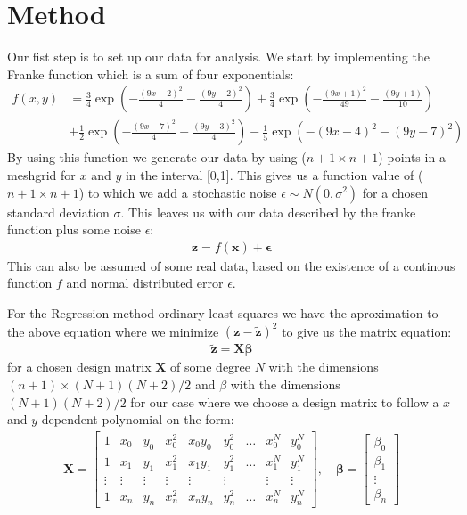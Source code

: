 \documentclass[12pt]{article}
\begin{document}
\section{Method}
Our fist step is to set up our data for analysis. We start by implementing the Franke function which is a sum of four exponentials:
\begin{align*}
  f(x,y) &= \frac{3}{4 }\exp\left(- \frac{(9x -2 )^2}{4} - \frac{(9y-2)^2}{4}\right) +\frac{3}{4}\exp{\left(-\frac{(9x+1)^2}{49}- \frac{(9y+1)}{10}\right)} \\
&+\frac{1}{2}\exp{\left(-\frac{(9x-7)^2}{4} - \frac{(9y-3)^2}{4}\right)} -\frac{1}{5}\exp{\left( -(9x-4)^2 - (9y-7)^2\right) }
\end{align*}
By using this function we generate our data by using ($n+1\times n+1$) points in a meshgrid for $x$ and $y$ in the interval [0,1]. This gives us a function value of ($n+1 \times n+1$) to which we add a stochastic noise $\epsilon \sim N(0,\sigma^2)$ for a chosen standard deviation $\sigma$. This leaves us with our data described by the franke function plus some noise $\epsilon$:
\begin{align*}
  \boldsymbol{z} = f(\boldsymbol{x}) + \boldsymbol{\epsilon}
\end{align*}
This can also be assumed of some real data, based on the existence of a continous function $f$ and normal distributed error $\epsilon$.

For the Regression method ordinary least squares we have the aproximation to the above equation where we minimize $(\boldsymbol{z} - \boldsymbol{\tilde{z}})^2$ to give us the matrix equation:
\begin{align*}
  \boldsymbol{\tilde{z}} = \boldsymbol{X}\boldsymbol{\beta}
\end{align*}
for a chosen design matrix $\boldsymbol{X}$ of some degree $N$ with the dimensions $(n+1)\times (N+1)(N+2)/2$ and $\beta$ with the dimensions $(N+1)(N+2)/2$  for our case where we choose a design matrix to follow a $x$ and $y$ dependent polynomial on the form:
\begin{align*}
  \boldsymbol{X} = \begin{bmatrix}
    1 & x_0 & y_0 & x_0^2 & x_0y_0 & y_0^2 & \hdots &x_0^N & y_0^N \\
    1 & x_1 & y_1 & x_1^2 & x_1y_1 & y_1^2 &\hdots& x_1^N & y_1^N \\
    \vdots & \vdots & \vdots & \vdots & \vdots &\vdots & &\vdots & \vdots \\
    1 & x_n & y_n & x_n^2 & x_ny_n & y_n^2 &\hdots& x_n^N & y_n^N
\end{bmatrix}
, \quad
\boldsymbol{\beta} =
\begin{bmatrix}
  \beta_0 \\
  \beta_1 \\
  \vdots \\
  \beta_n
\end{bmatrix}
\end{align*}
\end{document}
